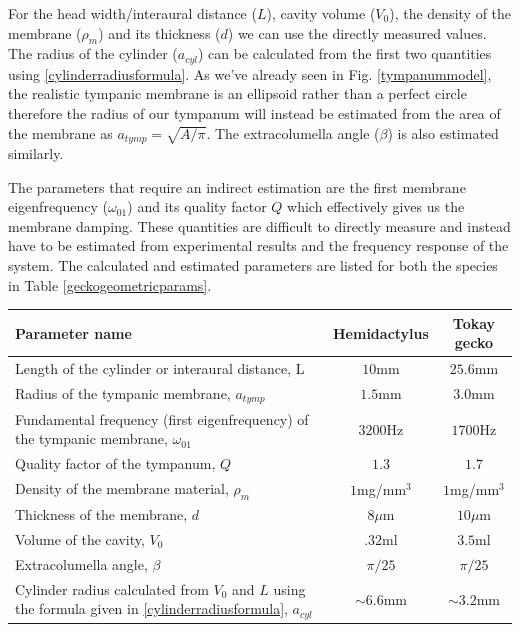 For the head width/interaural distance ($L$), cavity volume ($V_0$), the density of the membrane ($\rho_m$) and its thickness ($d$)
we can use the directly measured values. The radius of the cylinder ($a_{cyl}$) can be calculated from the first two quantities
using \eqref{cylinderradiusformula}. 
As we've already seen in Fig. \ref{tympanummodel}, the realistic tympanic membrane is an ellipsoid rather than a perfect circle therefore the radius of our tympanum will
instead be estimated from the area of the membrane as $a_{tymp}=\sqrt{A/\pi}$. The extracolumella angle ($\beta$) is also estimated similarly.

The parameters that require an indirect estimation are the first membrane eigenfrequency ($\omega_{01}$) and
its quality factor $Q$ which effectively gives us the membrane damping. These quantities are difficult to directly measure and instead
have to be estimated from experimental results and the frequency response of the system.
The calculated and estimated parameters are listed for both the species in Table \ref{geckogeometricparams}.

\vspace{\baselineskip}
\noindent
\begin{minipage}{\linewidth}
\renewcommand{\arraystretch}{1.3}
\centering
{}\label{geckogeometricparams}
\begin{tabular}{|p{8.5 cm} | c | c|}
\hline
Parameter name & Hemidactylus & Tokay gecko\\
\hline
Length of the cylinder or interaural distance, L & $10$mm & $25.6$mm\\
Radius of the tympanic membrane, $a_{tymp}$& $1.5$mm & $3.0$mm\\
Fundamental frequency (first eigenfrequency) of the tympanic membrane, $\omega_{01}$ & $3200$Hz & $1700$Hz\\
Quality factor of the tympanum, $Q$ & $1.3$ &  $1.7$\\
Density of the membrane material, $\rho_m$ & $1$mg/mm$^3$ & $1$mg/mm$^3$\\
Thickness of the membrane, $d$& $8\mu$m & $10\mu$m\\
Volume of the cavity, $V_0$ & $.32$ml & $3.5$ml\\ 
Extracolumella angle, $\beta$ & $\pi/25$ & $\pi/25$\\
Cylinder radius calculated from $V_0$ and $L$ using the formula given in \eqref{cylinderradiusformula}, $a_{cyl}$ & $\sim 6.6$mm  &$\sim 3.2$mm \\
\hline
\end {tabular}\par
\bigskip
\end{minipage}

